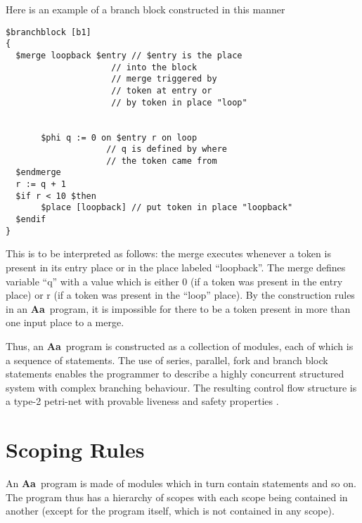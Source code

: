 \documentclass{article}
\newcommand{\Aa}{{\bf Aa}~}
\begin{document}
\begin{itemize}
Here is an example of a branch block constructed in this manner
\begin{verbatim}
$branchblock [b1] 
{
  $merge loopback $entry // $entry is the place
                     // into the block
                     // merge triggered by
                     // token at entry or
                     // by token in place "loop"


       $phi q := 0 on $entry r on loop 
                    // q is defined by where 
                    // the token came from
  $endmerge
  r := q + 1
  $if r < 10 $then 
       $place [loopback] // put token in place "loopback"
  $endif
}
\end{verbatim}
This is to be interpreted as follows: the merge executes
whenever a token is present in its entry place  or in 
the place labeled ``loopback''.
The merge defines variable ``q'' with a value which is
either 0 (if a token was present in the entry place)
or r (if a token was present in the ``loop'' place).
By the construction rules in an \Aa program, it is
impossible for there to be a token present in more
than one input place to a merge.
\end{itemize}

Thus, an \Aa program is constructed as a collection of modules,
each of which is a sequence of statements.  The use of series,
parallel, fork and branch block
statements enables the programmer to describe a highly concurrent
structured system with complex branching behaviour.  
The resulting control flow structure is a
type-2 petri-net with provable liveness and safety properties \cite{ref:SameerPhD}.

\section{Scoping Rules} \label{sec:Scopes}

An \Aa program is made of modules which in turn contain statements
and so on.  The program thus has a hierarchy of scopes with each
scope being contained in another (except for the program itself,
which is not contained in any scope).
\end{document}
